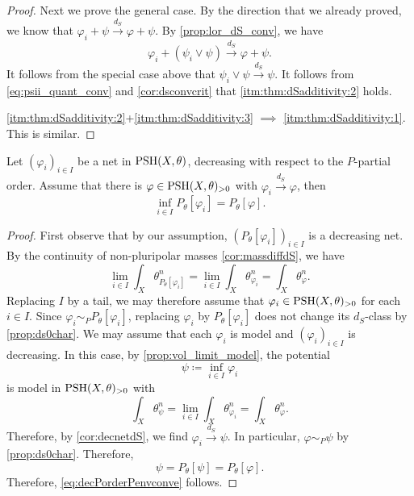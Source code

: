 \begin{proof}
Next we prove the general case. By the direction that we already proved, we know that $\varphi_i+\psi\xrightarrow{d_{S}} \varphi+\psi$. By \cref{prop:lor_dS_conv}, we have
\[
\varphi_i+(\psi_i\lor \psi)\xrightarrow{d_{S}} \varphi+\psi.
\]
It follows from the special case above that $\psi_i\lor \psi\xrightarrow{d_{S}}\psi$. It follows from \eqref{eq:psii_quant_conv} and \cref{cor:dsconvcrit} that \ref{itm:thm:dSadditivity:2} holds.

\ref{itm:thm:dSadditivity:2}+\ref{itm:thm:dSadditivity:3} $\implies$ \ref{itm:thm:dSadditivity:1}. This is similar.

\end{proof}

\begin{proposition}\label{prop:decPorderPenvconve}
    Let $(\varphi_i)_{i\in I}$ be a net in $\mathrm{PSH}(X,\theta)$, decreasing with respect to the $P$-partial order. Assume that there is $\varphi\in \mathrm{PSH}(X,\theta)_{>0}$ with $\varphi_i\xrightarrow{d_S}\varphi$, then
    \begin{equation}\label{eq:decPorderPenvconve}
        \inf_{i\in I} P_{\theta}[\varphi_i]=P_{\theta}[\varphi].
    \end{equation}
\end{proposition}
\begin{proof}
    First observe that by our assumption, $(P_{\theta}[\varphi_i])_{i\in I}$ is a decreasing net. By the continuity of non-pluripolar masses \cref{cor:massdiffdS}, we have
    \[
        \lim_{i\in I} \int_X \theta_{P_{\theta}[\varphi_i]}^n=\lim_{i\in I} \int_X \theta_{\varphi_i}^n= \int_X \theta_{\varphi}^n.
    \]
    Replacing $I$ by a tail, we may therefore assume that $\varphi_i\in \mathrm{PSH}(X,\theta)_{>0}$ for each $i\in I$.
    Since $\varphi_i\sim_P P_\theta[\varphi_i]$, replacing $\varphi_i$ by $P_\theta[\varphi_i]$ does not change its $d_S$-class by \cref{prop:ds0char}. We may assume that each $\varphi_i$ is model and $(\varphi_i)_{i\in I}$ is decreasing. In this case, by \cref{prop:vol_limit_model}, the potential
    \[
        \psi\coloneqq \inf_{i\in I} \varphi_i
    \]
    is model in $\mathrm{PSH}(X,\theta)_{>0}$ with
    \[
        \int_X \theta_{\psi}^n=\lim_{i\in I} \int_X \theta_{\varphi_i}^n= \int_X \theta_{\varphi}^n.
    \]
    Therefore, by \cref{cor:decnetdS}, we find $\varphi_i\xrightarrow{d_S}\psi$. In particular, $\varphi\sim_P \psi$ by \cref{prop:ds0char}. Therefore,
    \[
        \psi=P_{\theta}[\psi]=P_{\theta}[\varphi].
    \]
    Therefore, \eqref{eq:decPorderPenvconve} follows.
\end{proof}




